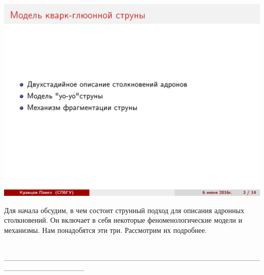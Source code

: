 \documentclass[14pt]{article}
\renewcommand{\line}{\\ \_\_\_\_\_\_\_\_\_\_\_\_\_\_\_\_\_\_\_\_\_\_\_\_\_\_\_\_\_\_\_\_\_\_\_\_\_\_\_\_\_\_\_\_\_\_\_\_\_\_\_\_\_\_\_\_\_\_\_\_\_\_\_ \\ }
\begin{document}
\begin{minipage}[h]{0.5\linewidth}
\includegraphics[width=1\linewidth]{page-03.jpg}
\end{minipage}
\begin{minipage}[h]{0.45\linewidth}
Для начала обсудим, в чем состоит струнный подход для описания адронных столкновений. Он включает в себя некоторые феноменологические модели и механизмы. Нам понадобятся эти три.
Рассмотрим их подробнее.
\end{minipage}
\line

\newpage
$$$$
$$$$
$$$$
$$$$
\end{document}
